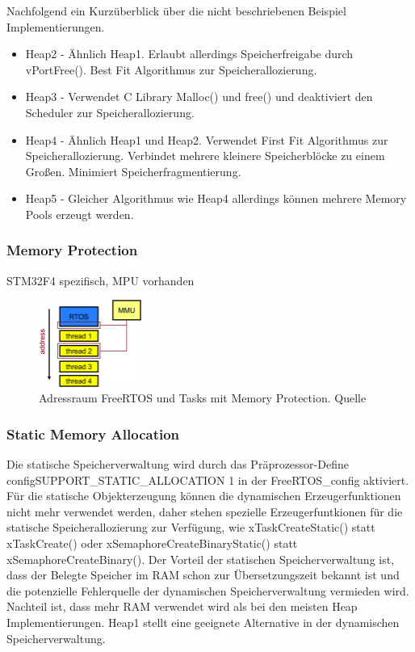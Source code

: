 Nachfolgend ein Kurzüberblick über die nicht beschriebenen Beispiel Implementierungen.  
\begin{itemize}
	\item Heap2 - Ähnlich Heap1. Erlaubt allerdings Speicherfreigabe durch vPortFree(). Best Fit Algorithmus zur Speicherallozierung. 
	\item Heap3 - Verwendet C Library Malloc() und free() und deaktiviert den Scheduler zur Speicherallozierung.
	\item Heap4 - Ähnlich Heap1 und Heap2. Verwendet First Fit Algorithmus zur Speicherallozierung. Verbindet mehrere kleinere Speicherblöcke zu einem Großen. Minimiert Speicherfragmentierung.
	\item Heap5 - Gleicher Algorithmus wie Heap4 allerdings können mehrere Memory Pools erzeugt werden.
\end{itemize}
\subsubsection{Memory Protection}
\label{sec:Memory Protection}
STM32F4 spezifisch, MPU vorhanden
\begin{figure}[hb!]
	\centering
		\includegraphics[width=0.3\textwidth]{Pictures/EmbeddedCom/addressSpaceMMU}
	\caption{Adressraum FreeRTOS und Tasks mit Memory Protection. Quelle~\protect{}}
	\label{fig:AddressSpaceMMU}
\end{figure} 
\subsubsection{Static Memory Allocation}
Die statische Speicherverwaltung wird durch das Prä\-pro\-zes\-sor-Define configSUPPORT\_STATIC\_ALLOCATION 1 in der FreeRTOS\_config aktiviert. Für die statische Objekterzeugung können die dynamischen Erzeugerfunktionen nicht mehr verwendet werden, daher stehen spezielle Erzeugerfuntkionen für die statische Speicherallozierung zur Verfügung, wie xTaskCreateStatic() statt xTaskCreate() oder xSemaphoreCreateBinaryStatic() statt xSemaphoreCreateBinary(). Der Vorteil der statischen Speicherverwaltung ist, dass der Belegte Speicher im RAM schon zur Übersetzungszeit bekannt ist und die potenzielle Fehlerquelle der dynamischen Speicherverwaltung vermieden wird. Nachteil ist, dass mehr RAM verwendet wird als bei den meisten Heap Implementierungen. Heap1 stellt eine geeignete Alternative in der dynamischen Speicherverwaltung.   

      